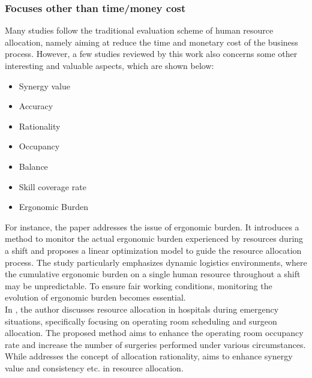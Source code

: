 \documentclass[runningheads]{llncs}
\begin{document}
\subsubsection{Focuses other than time/money cost}
Many studies follow the traditional evaluation scheme of human resource allocation, namely aiming at reduce the time and monetary cost of the business process. However, a few studies reviewed by this work also concerns some other interesting and valuable aspects, which are shown below:
\begin{itemize}
    \item Synergy value
    \item Accuracy
    \item Rationality
    \item Occupancy
    \item Balance
    \item Skill coverage rate
    \item Ergonomic Burden
\end{itemize}
For instance, the paper \cite{study16} addresses the issue of ergonomic burden. It introduces a method to monitor the actual ergonomic burden experienced by resources during a shift and proposes a linear optimization model to guide the resource allocation process. The study particularly emphasizes dynamic logistics environments, where the cumulative ergonomic burden on a single human resource throughout a shift may be unpredictable. To ensure fair working conditions, monitoring the evolution of ergonomic burden becomes essential.\\
In \cite{study8}, the author discusses resource allocation in hospitals during emergency situations, specifically focusing on operating room scheduling and surgeon allocation. The proposed method aims to enhance the operating room occupancy rate and increase the number of surgeries performed under various circumstances.\\
While \cite{study15} addresses the concept of allocation rationality, \cite{study19} aims to enhance synergy value and consistency etc. in resource allocation.
\begin{figure}
\end{figure}
\end{document}

